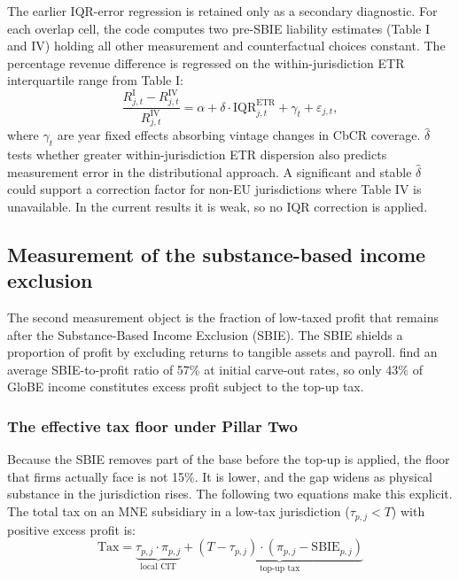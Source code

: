 \documentclass[11pt,a4paper]{article}
\begin{document}
The earlier IQR-error regression is retained only as a secondary diagnostic. For each overlap cell, the code computes two pre-SBIE liability estimates (Table I and IV) holding all other measurement and counterfactual choices constant. The percentage revenue difference is regressed on the within-jurisdiction ETR interquartile range from Table I:
\begin{equation}\label{eq:crossval_regression}
\frac{R_{j,t}^{\text{I}} - R_{j,t}^{\text{IV}}}{R_{j,t}^{\text{IV}}} = \alpha + \delta \cdot \text{IQR}_{j,t}^{\text{ETR}} + \gamma_t + \varepsilon_{j,t},
\end{equation}
where $\gamma_t$ are year fixed effects absorbing vintage changes in CbCR coverage. $\hat{\delta}$ tests whether greater within-jurisdiction ETR dispersion also predicts measurement error in the distributional approach. A significant and stable $\hat{\delta}$ could support a correction factor for non-EU jurisdictions where Table IV is unavailable. In the current results it is weak, so no IQR correction is applied.

\subsection{Measurement of the substance-based income exclusion}\label{sec:SBIE}

The second measurement object is the fraction of low-taxed profit that remains after the Substance-Based Income Exclusion (SBIE). The SBIE shields a proportion of profit by excluding returns to tangible assets and payroll. \citet{devereux2023} find an average SBIE-to-profit ratio of 57\% at initial carve-out rates, so only 43\% of GloBE income constitutes excess profit subject to the top-up tax.

\subsubsection{The effective tax floor under Pillar Two}\label{sec:floor}

Because the SBIE removes part of the base before the top-up is applied, the floor that firms actually face is not 15\%. It is lower, and the gap widens as physical substance in the jurisdiction rises. The following two equations make this explicit. The total tax on an MNE subsidiary in a low-tax jurisdiction ($\tau_{p,j} < T$) with positive excess profit is:
\begin{equation}\label{eq:total_tax}
\text{Tax} = \underbrace{\tau_{p,j} \cdot \pi_{p,j}}_{\text{local CIT}} + \underbrace{(T - \tau_{p,j}) \cdot (\pi_{p,j} - \text{SBIE}_{p,j})}_{\text{top-up tax}}
\end{equation}
\end{document}

